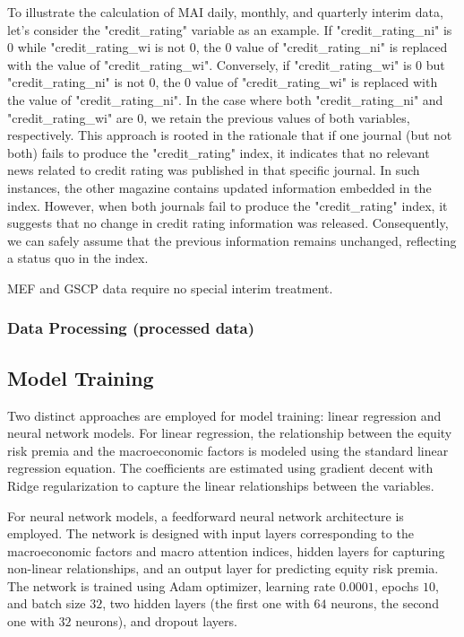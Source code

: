 \documentclass{article}
\begin{document}
To illustrate the calculation of MAI daily, monthly, and quarterly interim data, let's consider the "credit\_rating" variable as an example. If "credit\_rating\_ni" is $0$ while "credit\_rating\_wi is not $0$, the $0$ value of "credit\_rating\_ni" is replaced with the value of "credit\_rating\_wi". Conversely, if "credit\_rating\_wi" is $0$ but "credit\_rating\_ni" is not $0$, the $0$ value of "credit\_rating\_wi" is replaced with the value of "credit\_rating\_ni". In the case where both "credit\_rating\_ni" and "credit\_rating\_wi" are $0$, we retain the previous values of both variables, respectively. This approach is rooted in the rationale that if one journal (but not both) fails to produce the "credit\_rating" index, it indicates that no relevant news related to credit rating was published in that specific journal. In such instances, the other magazine contains updated information embedded in the index. However, when both journals fail to produce the "credit\_rating" index, it suggests that no change in credit rating information was released. Consequently, we can safely assume that the previous information remains unchanged, reflecting a status quo in the index.

MEF and GSCP data require no special interim treatment.

\subsubsection{Data Processing (processed data)}

\subsection{Model Training}

Two distinct approaches are employed for model training: linear regression and neural network models. For linear regression, the relationship between the equity risk premia and the macroeconomic factors is modeled using the standard linear regression equation. The coefficients are estimated using gradient decent with Ridge regularization to capture the linear relationships between the variables.

For neural network models, a feedforward neural network architecture is employed. The network is designed with input layers corresponding to the macroeconomic factors and macro attention indices, hidden layers for capturing non-linear relationships, and an output layer for predicting equity risk premia. The network is trained using Adam optimizer, learning rate $0.0001$, epochs $10$, and batch size $32$, two hidden layers (the first one with $64$ neurons, the second one with $32$ neurons), and dropout layers.
\end{document}
